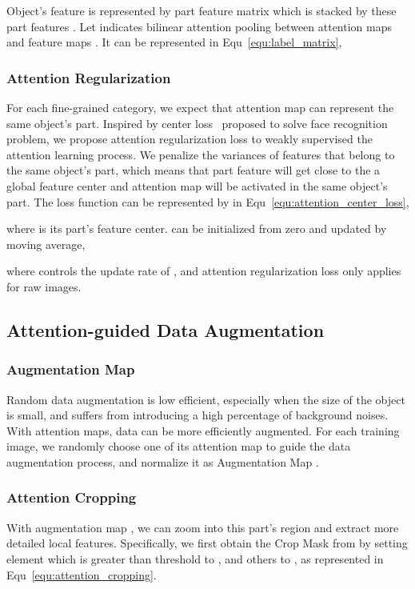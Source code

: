 \documentclass[10pt,twocolumn,letterpaper]{article}
\begin{document}
Object's feature is represented by part feature matrix  which is stacked by these part features . Let  indicates bilinear attention pooling between attention maps  and feature maps . It can be represented in Equ~\ref{equ:label_matrix},


\subsubsection{Attention Regularization}
For each fine-grained category, we expect that attention map  can represent the same  object's part.
Inspired by center loss~\cite{center_loss} proposed to solve face recognition problem, we propose attention regularization loss to weakly supervised the attention learning process. We penalize the variances of features that belong to the same object's part, which means that part feature  will get close to the a global feature center  and attention map  will be activated in the same  object's part. The loss function can be represented by  in Equ~\ref{equ:attention_center_loss},

where  is its part's feature center.   can be initialized from zero and updated by moving average,

where  controls the update rate of , and attention regularization loss only applies for raw images.




\subsection{Attention-guided Data Augmentation}
\label{subsec:augmentation}
\subsubsection{Augmentation Map}
Random data augmentation is low efficient, especially when the size of the object is small, and suffers from introducing a high percentage of background noises. With attention maps, data can be more efficiently augmented. For each training image, we randomly choose one of its attention map  to guide the data augmentation process, and normalize it as  Augmentation Map .


\subsubsection{Attention Cropping}
With augmentation map , we can zoom into this part's region and extract more detailed local features. Specifically, we first obtain the Crop Mask  from  by setting element  which is greater than threshold  to , and others to , as represented in Equ~\ref{equ:attention_cropping}.
\end{document}
